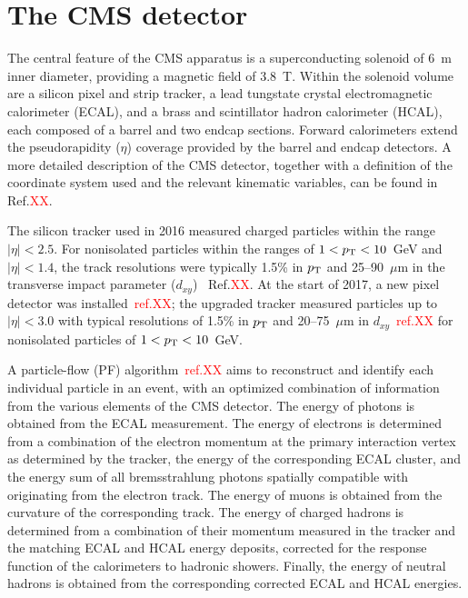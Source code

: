 \documentclass{cernatlasnote}
\newcommand{\mic}{$\mu$m\xspace}
\newcommand{\dxy}{$d_{xy}$\xspace}
\newcommand{\pt}{$p_{\text T}$\xspace}
\begin{document}
\section{The CMS detector}
\label{SEC: CMS}

The central feature of the CMS apparatus is a superconducting solenoid of 6~m inner diameter, providing a magnetic field of 3.8~T. Within the solenoid volume are a silicon pixel and strip tracker, a lead tungstate crystal electromagnetic calorimeter (ECAL), and a brass and scintillator hadron calorimeter (HCAL), each composed of a barrel and two endcap sections. Forward calorimeters extend the pseudorapidity ($\eta$) coverage provided by the barrel and endcap detectors. A more detailed description of the CMS detector, together with a definition of the coordinate system used and the relevant kinematic variables, can be found in Ref.\textcolor{red}{XX}.

The silicon tracker used in 2016 measured charged particles within the range $|\eta| < 2.5$. For nonisolated particles within the ranges of $1 < p_{\rm T} < 10$~GeV and $|\eta| < 1.4$, the track resolutions were typically 1.5\% in \pt and 25–90~\mic in the transverse impact parameter (\dxy) ~Ref.\textcolor{red}{XX}. At the start of 2017, a new pixel detector was installed~\textcolor{red}{ref.XX}; the upgraded tracker measured particles up to $|\eta| < 3.0$ with typical resolutions of 1.5\% in \pt and 20–75~\mic in \dxy~\textcolor{red}{ref.XX} for nonisolated particles of $1 < p_{\rm T} < 10$~GeV.

A particle-flow (PF) algorithm~\textcolor{red}{ref.XX} aims to reconstruct and identify each individual particle in an event, with an optimized combination of information from the various elements of the CMS detector. The energy of photons is obtained from the ECAL measurement. The energy of electrons is determined from a combination of the electron momentum at the primary interaction vertex as determined by the tracker, the energy of the corresponding ECAL cluster, and the energy sum of all bremsstrahlung photons spatially compatible with originating from the electron track. The energy of muons is obtained from the curvature of the corresponding track. The energy of charged hadrons is determined from a combination of their momentum measured in the tracker and the matching ECAL and HCAL energy deposits, corrected for the response function of the calorimeters to hadronic showers. Finally, the energy of neutral hadrons is obtained from the corresponding corrected ECAL and HCAL energies.
\end{document}
